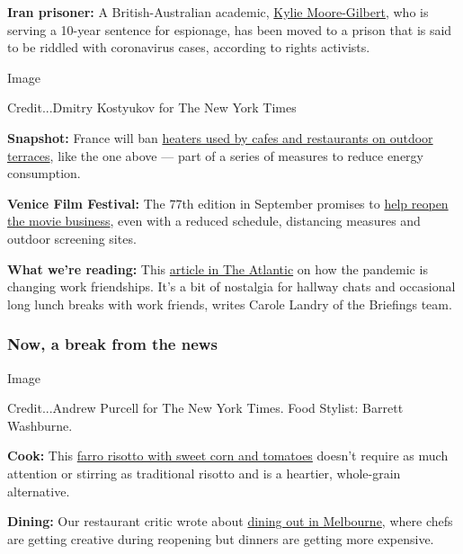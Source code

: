 \textbf{Iran prisoner:} A British-Australian academic,
\href{https://www.nytimes.com/2020/07/28/world/europe/british-australian-academic-jail-iran-qarchak.html}{Kylie
Moore-Gilbert}, who is serving a 10-year sentence for espionage, has
been moved to a prison that is said to be riddled with coronavirus
cases, according to rights activists.

Image

Credit...Dmitry Kostyukov for The New York Times

\textbf{Snapshot:} France will ban
\href{https://www.nytimes.com/2020/07/28/world/europe/france-heated-terraces-coronavirus.html}{heaters
used by cafes and restaurants on outdoor terraces}, like the one above
--- part of a series of measures to reduce energy consumption.

\textbf{Venice Film Festival:} The 77th edition in September promises to
\href{https://www.nytimes.com/2020/07/28/movies/venice-film-festival-2020-coronavirus.html}{help
reopen the movie business}, even with a reduced schedule, distancing
measures and outdoor screening sites.

\textbf{What we're reading:} This
\href{https://www.theatlantic.com/family/archive/2020/07/what-pandemic-doing-work-friendships/614407/}{article
in The Atlantic} on how the pandemic is changing work friendships. It's
a bit of nostalgia for hallway chats and occasional long lunch breaks
with work friends, writes Carole Landry of the Briefings team.

\hypertarget{now-a-break-from-the-news}{%
\subsubsection{Now, a break from the
news}\label{now-a-break-from-the-news}}

Image

Credit...Andrew Purcell for The New York Times. Food Stylist: Barrett
Washburne.

\textbf{Cook:} This
\href{https://cooking.nytimes.com/recipes/1020364-farro-risotto-with-sweet-corn-and-tomatoes}{farro
risotto with sweet corn and tomatoes} doesn't require as much attention
or stirring as traditional risotto and is a heartier, whole-grain
alternative.

\textbf{Dining:} Our restaurant critic wrote about
\href{https://www.nytimes.com/2020/07/28/dining/melbourne-restaurants-coronavirus.html}{dining
out in Melbourne}, where chefs are getting creative during reopening but
dinners are getting more expensive.

